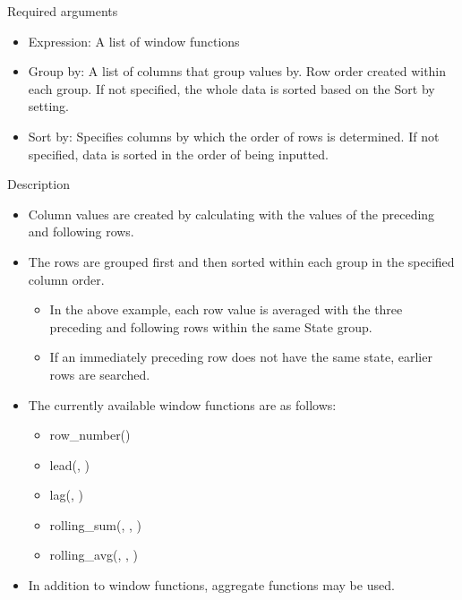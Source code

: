 \documentclass[letterpaper,10pt,english]{sphinxmanual}
\begin{document}
\begin{figure}[H]
\centering

\noindent{}
\end{figure}

Required arguments
\begin{itemize}
\item {} 
Expression: A list of window functions

\item {} 
Group by: A list of columns that group values by. Row order created within each group. If not specified, the whole data is sorted based on the Sort by setting.

\item {} 
Sort by: Specifies columns by which the order of rows is determined. If not specified, data is sorted in the order of being inputted.

\end{itemize}

Description
\begin{itemize}
\item {} 
Column values are created by calculating with the values of the preceding and following rows.

\item {} 
The rows are grouped first and then sorted within each group in the specified column order.
\begin{itemize}
\item {} 
In the above example, each row value is averaged with the three preceding and following rows within the same State group.

\item {} 
If an immediately preceding row does not have the same state, earlier rows are searched.

\end{itemize}

\item {} 
The currently available window functions are as follows:
\begin{itemize}
\item {} 
row\_number()

\item {} 
lead(, )

\item {} 
lag(, )

\item {} 
rolling\_sum(, , )

\item {} 
rolling\_avg(, , )

\end{itemize}

\item {} 
In addition to window functions, aggregate functions may be used.

\end{itemize}
\end{document}
